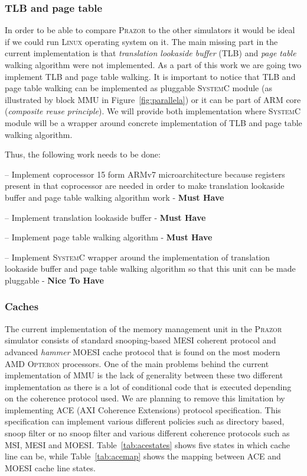 \documentclass{hitec}
\let\oldmarginpar\marginpar
\renewcommand\marginpar[1]{\-\oldmarginpar[\raggedleft #1]%
{\raggedright #1}}
\newenvironment{checklist}{%
  \begin{list}{}{}%
  \let\olditem\item
  \renewcommand\item{\olditem -- \marginpar{$\Box$} }
  \newcommand\checkeditem{\olditem -- \marginpar{$\CheckedBox$} }
}{%
  \end{list}
}
\begin{document}
\subsubsection{TLB and page table}
In order to be able to compare \textsc{Prazor} to the other simulators
it would be ideal if we could run \textsc{Linux} operating system on
it. The main missing part in the current implementation is that
\textit{translation lookaside buffer} (TLB) and \textit{page table} walking algorithm were not
implemented. As a part of this work we are going two implement TLB and
page table walking. It is important to notice that TLB and page table
walking can be implemented as pluggable \textsc{SystemC} module (as
illustrated by block \textsc{MMU} in Figure~\ref{fig:parallela}) or it
can be part of \textsc{ARM} core (\textit{composite reuse
  principle}). We will provide both implementation where
\textsc{SystemC} module will be a wrapper around concrete
implementation of TLB and page table walking algorithm. 

Thus, the following work needs to be done:

\begin{checklist}
\item Implement coprocessor 15 form ARMv7 microarchitecture because
  registers present in that coprocessor are needed in order to make
  translation lookaside buffer and page table walking algorithm work -
  \textbf{Must Have}
\item Implement translation lookaside buffer - \textbf{Must Have}
\item Implement page table walking algorithm - \textbf{Must Have}
\checkeditem Implement \textsc{SystemC} wrapper around the
implementation of translation lookaside buffer and page table walking
algorithm so that this unit can be made pluggable - \textbf{Nice To Have}
\end{checklist}

\subsubsection{Caches}
The current implementation of the memory management unit in the
\textsc{Prazor} simulator consists of standard snooping-based MESI
coherent protocol and advanced \textit{hammer} MOESI cache protocol
that is found on the most modern \textsc{AMD Opteron} processors. One
of the main problems behind the current implementation of MMU is the
lack of generality between these two different implementation as there
is a lot of conditional code that is executed depending on the
coherence protocol used. We are planning to remove this limitation by
implementing \textsc{ACE} (\textsc{AXI} Coherence Extensions) protocol
specification. This specification can implement various different
policies such as directory based, snoop filter or no snoop filter and
various different coherence protocols such as MSI, MESI and
MOESI. Table~\ref{tab:acestates} shows five states in which cache line
can be, while Table~\ref{tab:acemap} shows the mapping between ACE and
MOESI cache line states. 
\end{document}
